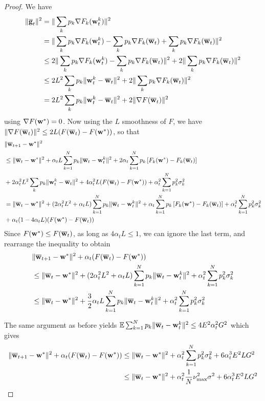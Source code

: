 \begin{proof}
	We have
	\begin{align*}
	\|{\overline{\mathbf{g}}}_{t}\|^{2} & =\|\sum_{k}p_{k}\nabla F_{k}({\mathbf{w}}_{t}^{k})\|^{2}\\
	& =\|\sum_{k}p_{k}\nabla F_{k}({\mathbf{w}}_{t}^{k})-\sum_{k}p_{k}\nabla F_{k}({\overline{\mathbf{w}}}_{t})+\sum_{k}p_{k}\nabla F_{k}({\overline{\mathbf{w}}}_{t})\|^{2}\\
	& \leq2\|\sum_{k}p_{k}\nabla F_{k}({\mathbf{w}}_{t}^{k})-\sum_{k}p_{k}\nabla F_{k}({\overline{\mathbf{w}}}_{t})\|^{2}+2\|\sum_{k}p_{k}\nabla F_{k}({\overline{\mathbf{w}}}_{t})\|^{2}\\
	& \leq2L^{2}\sum_{k}p_{k}\|{\mathbf{w}}_{t}^{k}-{\overline{\mathbf{w}}}_{t}\|^{2}+2\|\sum_{k}p_{k}\nabla F_{k}({\overline{\mathbf{w}}}_{t})\|^{2}\\
	& =2L^{2}\sum_{k}p_{k}\|{\mathbf{w}}_{t}^{k}-{\overline{\mathbf{w}}}_{t}\|^{2}+2\|\nabla F({\overline{\mathbf{w}}}_{t})\|^{2}
	\end{align*}
	using $\nabla F({\mathbf{w}}^{\ast})=0$. Now using the $L$ smoothness of $F$,
	we have $\|\nabla F({\overline{\mathbf{w}}}_{t})\|^{2}\leq2L(F({\overline{\mathbf{w}}}_{t})-F({\mathbf{w}}^{\ast}))$,
	so that 
	\begin{align*}
	& \|{\overline{\mathbf{w}}}_{t+1}-{\mathbf{w}}^{\ast}\|^{2}\\
	& \leq\|{\overline{\mathbf{w}}}_{t}-{\mathbf{w}}^{\ast}\|^{2}+\alpha_{t}L\sum_{k=1}^{N}p_{k}\|{\overline{\mathbf{w}}}_{t}-{\mathbf{w}}_{t}^{k}\|^{2}+2\alpha_{t}\sum_{k=1}^{N}p_{k}\left[F_{k}({\mathbf{w}}^{\ast})-F_{k}({\overline{\mathbf{w}}}_{t})\right]\\
	& +2\alpha_{t}^{2}L^{2}\sum_{k}p_{k}\|{\mathbf{w}}_{t}^{k}-{\overline{\mathbf{w}}}_{t}\|^{2}+4\alpha_{t}^{2}L(F({\overline{\mathbf{w}}}_{t})-F({\mathbf{w}}^{\ast}))+\alpha_{t}^{2}\sum_{k=1}^{N}p_{k}^{2}\sigma_{k}^{2}\\
	& =\|{\overline{\mathbf{w}}}_{t}-{\mathbf{w}}^{\ast}\|^{2}+(2\alpha_{t}^{2}L^{2}+\alpha_{t}L)\sum_{k=1}^{N}p_{k}\|{\overline{\mathbf{w}}}_{t}-{\mathbf{w}}_{t}^{k}\|^{2}+\alpha_{t}\sum_{k=1}^{N}p_{k}\left[F_{k}({\mathbf{w}}^{\ast})-F_{k}({\overline{\mathbf{w}}}_{t})\right]+\alpha_{t}^{2}\sum_{k=1}^{N}p_{k}^{2}\sigma_{k}^{2}\\
	& +\alpha_{t}(1-4\alpha_{t}L)(F({\mathbf{w}}^{\ast})-F({\overline{\mathbf{w}}}_{t}))
	\end{align*}
	Since $F({\mathbf{w}}^{\ast})\leq F({\overline{\mathbf{w}}}_{t})$, as long as $4\alpha_{t}L\leq1$,
	we can ignore the last term, and rearrange the inequality to obtain
	\begin{align*}
	& \|{\overline{\mathbf{w}}}_{t+1}-{\mathbf{w}}^{\ast}\|^{2}+\alpha_{t}(F({\overline{\mathbf{w}}}_{t})-F({\mathbf{w}}^{\ast}))\\
	& \leq\|{\overline{\mathbf{w}}}_{t}-{\mathbf{w}}^{\ast}\|^{2}+(2\alpha_{t}^{2}L^{2}+\alpha_{t}L)\sum_{k=1}^{N}p_{k}\|{\overline{\mathbf{w}}}_{t}-{\mathbf{w}}_{t}^{k}\|^{2}+\alpha_{t}^{2}\sum_{k=1}^{N}p_{k}^{2}\sigma_{k}^{2}\\
	& \leq\|{\overline{\mathbf{w}}}_{t}-{\mathbf{w}}^{\ast}\|^{2}+\frac{3}{2}\alpha_{t}L\sum_{k=1}^{N}p_{k}\|{\overline{\mathbf{w}}}_{t}-{\mathbf{w}}_{t}^{k}\|^{2}+\alpha_{t}^{2}\sum_{k=1}^{N}p_{k}^{2}\sigma_{k}^{2}
	\end{align*}
	
	The same argument as before yields $\mathbb{E}\sum_{k=1}^{N}p_{k}\|{\overline{\mathbf{w}}}_{t}-{\mathbf{w}}_{t}^{k}\|^{2}\leq4E^{2}\alpha_{t}^{2}G^{2}$
	which gives 
	\begin{align*}
	\|{\overline{\mathbf{w}}}_{t+1}-{\mathbf{w}}^{\ast}\|^{2}+\alpha_{t}(F({\overline{\mathbf{w}}}_{t})-F({\mathbf{w}}^{\ast})) & \leq\|{\overline{\mathbf{w}}}_{t}-{\mathbf{w}}^{\ast}\|^{2}+\alpha_{t}^{2}\sum_{k=1}^{N}p_{k}^{2}\sigma_{k}^{2}+6\alpha_{t}^{3}E^{2}LG^{2}\\
	& \leq\|{\overline{\mathbf{w}}}_{t}-{\mathbf{w}}^{\ast}\|^{2}+\alpha_{t}^{2}\frac{1}{N}\nu_{\max}^{2}\sigma^{2}+6\alpha_{t}^{3}E^{2}LG^{2}
	\end{align*}
\end{proof}
